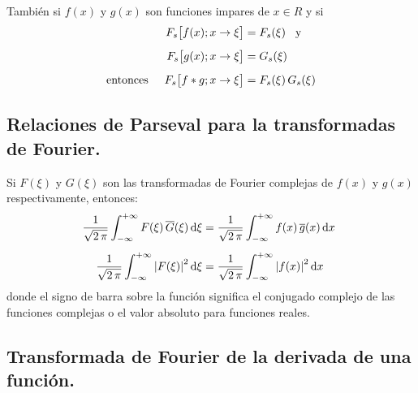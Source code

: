 También si $f(x)$ y $g(x)$ son funciones impares de $x \in R$ y si
\begin{align}
\begin{aligned}[b]
F_{s} \big[f(x); x \to \xi \big] &= F_{s}(\xi) \hspace{0.3cm} \mbox{y} \\[0.5em]
F_{s} \big[g(x); x \to \xi \big] &= G_{s}(\xi) \\[0.5em]
\mbox{entonces} \hspace{0.5cm} F_{s} \big[f * g; x \to \xi \big] &= F_{s} (\xi) \, G_{s}(\xi) 
\end{aligned}
\label{eq:ecuacion_01_29}
\end{align}

\subsection{Relaciones de Parseval para la transformadas de Fourier.}

Si $F(\xi)$ y $G(\xi)$ son las transformadas de Fourier complejas de $f(x)$ y $g(x)$ respectivamente, entonces:
\begin{align}
\dfrac{1}{\sqrt{2 \, \pi}} \int_{-\infty}^{+\infty} F(\xi) \, \overline{G}(\xi) \dd{\xi} &= \dfrac{1}{\sqrt{2 \, \pi}} \int_{-\infty}^{+\infty} f(x) \, \overline{g}(x) \dd{x} \label{eq:ecuacion_01_30} \\[0.5em]
\dfrac{1}{\sqrt{2 \, \pi}} \int_{-\infty}^{+\infty} \abs{F(\xi)}^{2} \dd{\xi} &= \dfrac{1}{\sqrt{2 \, \pi}} \int_{-\infty}^{+\infty} \abs{f(x)}^{2} \dd{x} \label{eq:ecuacion_01_31}
\end{align}
donde el signo de barra sobre la función significa el conjugado complejo de las funciones complejas o el valor absoluto para funciones reales.

\subsection{Transformada de Fourier de la derivada de una función.}

